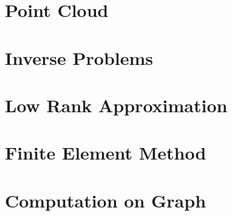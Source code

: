\section{Point Cloud}

\section{Inverse Problems}

\section{Low Rank Approximation}

\section{Finite Element Method}

\section{Computation on Graph}